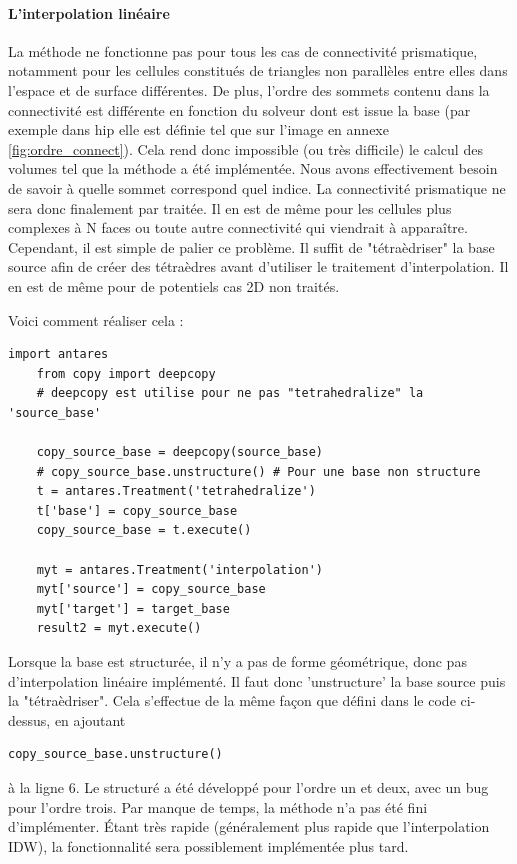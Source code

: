 \label{prisme}\paragraph{L'interpolation linéaire}

La méthode ne fonctionne pas pour tous les cas de connectivité prismatique, notamment pour les cellules constitués de triangles non parallèles entre elles dans l'espace et de surface différentes. De plus, l'ordre des sommets contenu dans la connectivité est différente en fonction du solveur dont est issue la base (par exemple dans hip elle est définie tel que sur l'image en annexe \ref{fig:ordre_connect}). Cela rend donc impossible (ou très difficile) le calcul des volumes tel que la méthode a été implémentée. Nous avons effectivement besoin de savoir à quelle sommet correspond quel indice. La connectivité prismatique ne sera donc finalement par traitée. Il en est de même pour les cellules plus complexes à N faces ou toute autre connectivité qui viendrait à apparaître.
Cependant, il est simple de palier ce problème. Il suffit de "tétraèdriser" la base source afin de créer des tétraèdres avant d'utiliser le traitement d'interpolation. Il en est de même pour de potentiels cas 2D non traités.

Voici comment réaliser cela :

\begin{lstlisting}[caption=Tetrahedralize pour interpoler linéairement tous types de cellules, label={lst:tet}]
    import antares
    from copy import deepcopy
    # deepcopy est utilise pour ne pas "tetrahedralize" la 'source_base' 
    
    copy_source_base = deepcopy(source_base)
    # copy_source_base.unstructure() # Pour une base non structure
    t = antares.Treatment('tetrahedralize')
    t['base'] = copy_source_base
    copy_source_base = t.execute()

    myt = antares.Treatment('interpolation')
    myt['source'] = copy_source_base
    myt['target'] = target_base
    result2 = myt.execute()
\end{lstlisting}

Lorsque la base est structurée, il n'y a pas de forme géométrique, donc pas d'interpolation linéaire implémenté. Il faut donc 'unstructure' la base source puis la "tétraèdriser". Cela s'effectue de la même façon que défini dans le code ci-dessus, en ajoutant 
\begin{lstlisting}[]
    copy_source_base.unstructure()
\end{lstlisting}
à la ligne 6. Le structuré a été développé pour l'ordre un et deux, avec un bug pour l'ordre trois. Par manque de temps, la méthode n'a pas été fini d'implémenter. Étant très rapide (généralement plus rapide que l'interpolation IDW), la fonctionnalité sera possiblement implémentée plus tard.


